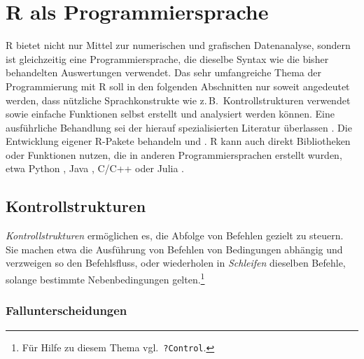 \chapter{R als Programmiersprache}
\label{sec:programming}

R bietet nicht nur Mittel zur numerischen und grafischen Datenanalyse, sondern ist gleichzeitig eine Programmiersprache, die dieselbe Syntax wie die bisher behandelten Auswertungen verwendet. Das sehr umfangreiche Thema der Programmierung mit R soll in den folgenden Abschnitten nur soweit angedeutet werden, dass nützliche Sprachkonstrukte wie z.\,B.\ Kontrollstrukturen verwendet sowie einfache Funktionen selbst erstellt und analysiert werden können. Eine ausführliche Behandlung sei der hierauf spezialisierten Literatur überlassen \cite{Chambers2008,Gillespie2017,Wickham2014a}. Die Entwicklung eigener R-Pakete behandeln  und . R kann auch direkt Bibliotheken oder Funktionen nutzen, die in anderen Programmiersprachen erstellt wurden, etwa Python \cite{Allaire2018}, Java \cite{Urbanek2018}, C/C++ \cite{Eddelbuettel2013} oder Julia \cite{Li2018}.

\section{Kontrollstrukturen}

\emph{Kontrollstrukturen} ermöglichen es, die Abfolge von Befehlen gezielt zu steuern. Sie machen etwa die Ausführung von Befehlen von Bedingungen abhängig und verzweigen so den Befehlsfluss, oder wiederholen in \emph{Schleifen} dieselben Befehle, solange bestimmte Nebenbedingungen gelten.\footnote{Für Hilfe zu diesem Thema vgl.\ \lstinline!?Control!.}

\subsection{Fallunterscheidungen}
\label{sec:ifElseSwitch}

